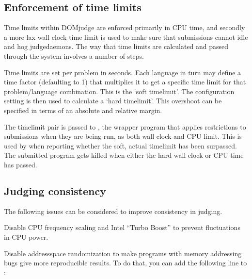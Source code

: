 \documentclass[a4paper,10pt,english,openany]{sphinxmanual}
\begin{document}
\subsection{Enforcement of time limits}
\label{\detokenize{judging:enforcement-of-time-limits}}
\sphinxAtStartPar
Time limits within DOMjudge are enforced primarily in CPU time, and
secondly a more lax wall clock time limit is used to make sure that
submissions cannot idle and hog judgedaemons. The way that time limits
are calculated and passed through the system involves a number of
steps.

\sphinxAtStartPar
Time limits are set per problem in seconds. Each language in turn may
define a time factor (defaulting to 1) that multiplies it to get a
specific time limit for that problem/language combination. This is
the ‘soft timelimit’. The configuration setting  is then used to calculate a ‘hard timelimit’.
This overshoot can be specified in terms of an absolute and relative
margin.

\sphinxAtStartPar
The  timelimit pair is passed to , the wrapper
program that applies restrictions to submissions when they are being
run, as both wall clock and CPU limit. This is used by  when
reporting whether the soft, actual timelimit has been surpassed. The
submitted program gets killed when either the hard wall clock or CPU
time has passed.


\subsection{Judging consistency}
\label{\detokenize{judging:judging-consistency}}\label{\detokenize{judging:id2}}
\sphinxAtStartPar
The following issues can be considered to improve consistency in
judging.

\sphinxAtStartPar
Disable CPU frequency scaling and Intel “Turbo Boost” to
prevent fluctuations in CPU power.

\sphinxAtStartPar
Disable address\sphinxhyphen{}space randomization to make programs with
memory addressing bugs give more reproducible results. To
do that, you can add the following line to :

\begin{sphinxVerbatim}[commandchars=\\\{\}]
\end{sphinxVerbatim}
\end{document}
